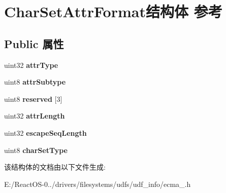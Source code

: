 \hypertarget{struct_char_set_attr_format}{}\section{Char\+Set\+Attr\+Format结构体 参考}
\label{struct_char_set_attr_format}
\subsection*{Public 属性}
\begin{DoxyCompactItemize}
\item 
\mbox{\label{struct_char_set_attr_format_a2d7e1fa92bca6dfaf55c0dea30f0afa0}} 
uint32 {\bfseries attr\+Type}
\item 
\mbox{\label{struct_char_set_attr_format_a96940632361765a385b34ccff25019a7}} 
uint8 {\bfseries attr\+Subtype}
\item 
\mbox{\label{struct_char_set_attr_format_a49345b196fdcb8c2073a9e2bc2c686ec}} 
uint8 {\bfseries reserved} \mbox{[}3\mbox{]}
\item 
\mbox{\label{struct_char_set_attr_format_a04521d440887be93a4b9041375ecaf22}} 
uint32 {\bfseries attr\+Length}
\item 
\mbox{\label{struct_char_set_attr_format_ac1977e53708709787181312755c93996}} 
uint32 {\bfseries escape\+Seq\+Length}
\item 
\mbox{\label{struct_char_set_attr_format_aaac6dd723db572f8339ce8c304930844}} 
uint8 {\bfseries char\+Set\+Type}
\end{DoxyCompactItemize}


该结构体的文档由以下文件生成\+:\begin{DoxyCompactItemize}
\item 
E\+:/\+React\+O\+S-\/0../drivers/filesystems/udfs/udf\+\_\+info/ecma\+\_.\+h\end{DoxyCompactItemize}

